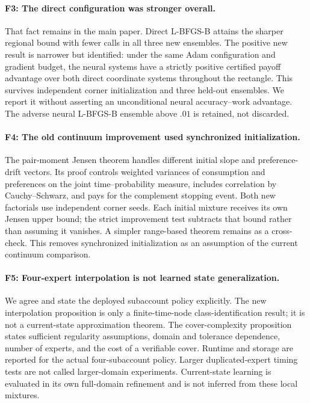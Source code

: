 \paragraph{F3: The direct configuration was stronger overall.}
That fact remains in the main paper. Direct L-BFGS-B attains the sharper regional bound with fewer calls in all three new ensembles. The positive new result is narrower but identified: under the same Adam configuration and gradient budget, the neural systems have a strictly positive certified payoff advantage over both direct coordinate systems throughout the rectangle. This survives independent corner initialization and three held-out ensembles. We report it without asserting an unconditional neural accuracy--work advantage. The adverse neural L-BFGS-B ensemble above $.01$ is retained, not discarded.

\paragraph{F4: The old continuum improvement used synchronized initialization.}
The pair-moment Jensen theorem handles different initial slope and preference-drift vectors. Its proof controls weighted variances of consumption and preferences on the joint time--probability measure, includes correlation by Cauchy--Schwarz, and pays for the complement stopping event. Both new factorials use independent corner seeds. Each initial mixture receives its own Jensen upper bound; the strict improvement test subtracts that bound rather than assuming it vanishes. A simpler range-based theorem remains as a cross-check. This removes synchronized initialization as an assumption of the current continuum comparison.

\paragraph{F5: Four-expert interpolation is not learned state generalization.}
We agree and state the deployed subaccount policy explicitly. The new interpolation proposition is only a finite-time-node class-identification result; it is not a current-state approximation theorem. The cover-complexity proposition states sufficient regularity assumptions, domain and tolerance dependence, number of experts, and the cost of a verifiable cover. Runtime and storage are reported for the actual four-subaccount policy. Larger duplicated-expert timing tests are not called larger-domain experiments. Current-state learning is evaluated in its own full-domain refinement and is not inferred from these local mixtures.

